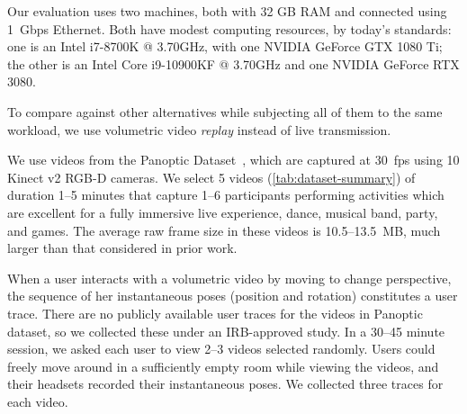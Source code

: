 %
Our evaluation uses two machines, both with 32 GB RAM and connected using 1~Gbps Ethernet.
%
Both have modest computing resources, by today's standards: one is an Intel i7-8700K @ 3.70GHz, with one NVIDIA GeForce GTX 1080 Ti; the other is an Intel Core i9-10900KF @ 3.70GHz and one NVIDIA GeForce RTX 3080.

%

%
To compare \livo against other alternatives while subjecting all of them to the same workload, we use volumetric video \textit{replay} instead of live transmission.
%
%

%
%
We use videos from the Panoptic Dataset~\cite{panoptic}, which are
captured at 30~fps using 10 Kinect v2 RGB-D cameras.
%
We select 5 videos (\cref{tab:dataset-summary}) of duration 1--5 minutes that capture 1--6 participants performing activities which are excellent for a fully immersive live experience, \eg dance, musical band, party, and games.
%
The average raw frame size in these videos is 10.5--13.5~MB,
%
much larger than that considered in prior work.
%

%
When a user interacts with a volumetric video by moving to change perspective, the sequence of her instantaneous poses (position and rotation) constitutes a user trace.
%
There are no publicly available user traces for the videos in Panoptic dataset, so we collected these under an IRB-approved study.
%
%
In a 30--45 minute session, we asked each user to view 2--3 videos selected randomly.
%
Users could freely move around in a sufficiently empty room while viewing the videos, and their headsets recorded their instantaneous poses.
%
We collected three traces for each video.

